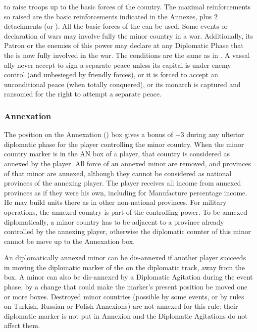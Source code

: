 to raise troops up to the basic forces of the country.  The maximal
reinforcements so raised are the basic reinforcements indicated in the
Annexes, plus 2 detachments (\LD or \ND).
\bparag All the basic forces of the \MIN can be used.
Some events or declaration of wars may involve fully the minor country in a
war.  Additionally, its Patron or the enemies of this power may declare at any
Diplomatic Phase that the \VASSAL is now fully involved in the war.
\bparag The conditions are the same as in \EW.
A vassal ally never accept to sign a separate peace unless its capital is
under enemy control (and unbesieged by friendly forces), or it is forced to
accept an unconditional peace (when totally conquered), or its monarch is
captured and ransomed for the right to attempt a separate peace.


\subsubsection{Annexation}
\aparag The position on the Annexation (\ANNEXION) box gives a bonus of +3
during any ulterior diplomatic phase for the player controlling the minor
country.  When the minor country marker is in the AN box of a player, that
country is considered as annexed by the player.
All force of an annexed minor are removed, and provinces of that minor are
annexed, although they cannot be considered as national provinces of the
annexing player.
\bparag The player receives all income from annexed provinces as if they were
his own, including for Manufacture percentage income.
\bparag He may build units there as in other non-national provinces.
\bparag For military operations, the annexed country is part of the
controlling power.
To be annexed diplomatically, a minor country has to be adjacent to a province
already controlled by the annexing player, otherwise the diplomatic counter of
this minor cannot be move up to the Annexation box.

An diplomatically annexed minor can be dis-annexed if another player succeeds
in moving the diplomatic marker of the \MIN on the diplomatic track, away from
the \ANNEXION box.
\bparag A minor can also be dis-annexed by a Diplomatic Agitation during the
event phase, by a change that could make the marker's present position be
moved one or more boxes.
\bparag Destroyed minor countries (possible by some events, or by rules on
Turkish, Russian or Polish Annexions) are not annexed for this rule: their
diplomatic marker is not put in Annexion and the Diplomatic Agitations do not
affect them.


